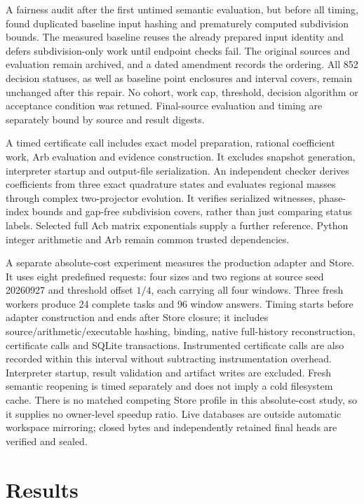 \documentclass[11pt,a4paper]{article}
\theoremstyle{definition}\newtheorem{definition}[theorem]{Definition}
\begin{document}
A fairness audit after the first untimed semantic evaluation, but before all timing, found duplicated baseline input hashing and prematurely computed subdivision bounds. The measured baseline reuses the already prepared input identity and defers subdivision-only work until endpoint checks fail. The original sources and evaluation remain archived, and a dated amendment records the ordering. All 852 decision statuses, as well as baseline point enclosures and interval covers, remain unchanged after this repair. No cohort, work cap, threshold, decision algorithm or acceptance condition was retuned. Final-source evaluation and timing are separately bound by source and result digests.

A timed certificate call includes exact model preparation, rational coefficient work, Arb evaluation and evidence construction. It excludes snapshot generation, interpreter startup and output-file serialization. An independent checker derives coefficients from three exact quadrature states and evaluates regional masses through complex two-projector evolution. It verifies serialized witnesses, phase-index bounds and gap-free subdivision covers, rather than just comparing status labels. Selected full Acb matrix exponentials supply a further reference. Python integer arithmetic and Arb remain common trusted dependencies.

A separate absolute-cost experiment measures the production adapter and Store. It uses eight predefined requests: four sizes and two regions at source seed 20260927 and threshold offset $1/4$, each carrying all four windows. Three fresh workers produce 24 complete tasks and 96 window answers. Timing starts before adapter construction and ends after Store closure; it includes source/arithmetic/executable hashing, binding, native full-history reconstruction, certificate calls and SQLite transactions. Instrumented certificate calls are also recorded within this interval without subtracting instrumentation overhead. Interpreter startup, result validation and artifact writes are excluded. Fresh semantic reopening is timed separately and does not imply a cold filesystem cache. There is no matched competing Store profile in this absolute-cost study, so it supplies no owner-level speedup ratio. Live databases are outside automatic workspace mirroring; closed bytes and independently retained final heads are verified and sealed.

\section{Results}
\end{document}
